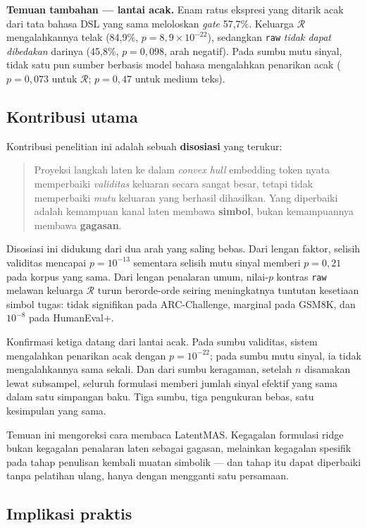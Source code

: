 \documentclass{laporanta1statugm}
\newcommand{\code}[1]{\texttt{#1}}
\begin{document}
\textbf{Temuan tambahan --- lantai acak.} Enam ratus ekspresi yang ditarik
acak dari tata bahasa DSL yang sama meloloskan \textit{gate} 57,7\%.
Keluarga $\mathcal{R}$ mengalahkannya telak (84,9\%,
$p = 8{,}9\times10^{-22}$), sedangkan \code{raw} \emph{tidak dapat dibedakan}
darinya (45,8\%, $p = 0{,}098$, arah negatif). Pada sumbu mutu sinyal, tidak
satu pun sumber berbasis model bahasa mengalahkan penarikan acak
($p = 0{,}073$ untuk $\mathcal{R}$; $p = 0{,}47$ untuk medium teks).

\subsection{Kontribusi utama}

Kontribusi penelitian ini adalah sebuah \textbf{disosiasi} yang terukur:

\begin{quote}
Proyeksi langkah laten ke dalam \textit{convex hull} embedding token nyata
memperbaiki \emph{validitas} keluaran secara sangat besar, tetapi tidak
memperbaiki \emph{mutu} keluaran yang berhasil dihasilkan. Yang diperbaiki
adalah kemampuan kanal laten membawa \textbf{simbol}, bukan kemampuannya
membawa \textbf{gagasan}.
\end{quote}

Disosiasi ini didukung dari dua arah yang saling bebas. Dari lengan faktor,
selisih validitas mencapai $p = 10^{-13}$ sementara selisih mutu sinyal
memberi $p = 0{,}21$ pada korpus yang sama. Dari lengan penalaran umum, nilai-$p$
kontras \code{raw} melawan keluarga $\mathcal{R}$ turun berorde-orde seiring
meningkatnya tuntutan kesetiaan simbol tugas: tidak signifikan pada
ARC-Challenge, marginal pada GSM8K, dan $10^{-8}$ pada HumanEval+.

Konfirmasi ketiga datang dari lantai acak. Pada sumbu validitas, sistem
mengalahkan penarikan acak dengan $p = 10^{-22}$; pada sumbu mutu sinyal, ia
tidak mengalahkannya sama sekali. Dan dari sumbu keragaman, setelah $n$
disamakan lewat subsampel, seluruh formulasi memberi jumlah sinyal efektif
yang sama dalam satu simpangan baku. Tiga sumbu, tiga pengukuran bebas, satu
kesimpulan yang sama.

Temuan ini mengoreksi cara membaca LatentMAS. Kegagalan formulasi ridge bukan
kegagalan penalaran laten sebagai gagasan, melainkan kegagalan spesifik pada
tahap penulisan kembali muatan simbolik --- dan tahap itu dapat diperbaiki
tanpa pelatihan ulang, hanya dengan mengganti satu persamaan.

\subsection{Implikasi praktis}
\end{document}
